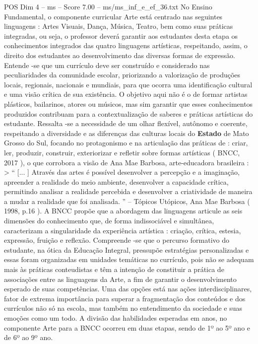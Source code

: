 \begin{textsample}{POS Dim 4 – ms – Score 7.00 – ms/ms\_inf\_e\_ef\_36.txt}
No Ensino Fundamental, o componente curricular Arte está centrado nas seguintes linguagens : Artes Visuais, Dança, Música, Teatro, bem como suas práticas integradas, ou seja, o professor deverá garantir aos estudantes desta etapa os conhecimentos integrados das quatro linguagens artísticas, respeitando, assim, o direito dos estudantes ao desenvolvimento das diversas formas de expressão.
Entende -se que um currículo deve ser construído e considerado nas peculiaridades da comunidade escolar, priorizando a valorização de produções locais, regionais, nacionais e mundiais, para que ocorra uma identificação cultural e uma visão crítica de sua existência.
O objetivo aqui não é o de formar artistas plásticos, bailarinos, atores ou músicos, mas sim garantir que esses conhecimentos produzidos contribuam para a contextualização de saberes e práticas artísticas do estudante.
Ressalta -se a necessidade de um olhar flexível, autônomo e coerente, respeitando a diversidade e as diferenças das culturas locais do \textbf{Estado} de Mato Grosso do Sul, focando no protagonismo e na articulação das práticas de : criar, ler, produzir, construir, exteriorizar e refletir sobre formas artísticas ( BNCC, 2017 ), o que corrobora a visão de Ana Mae Barbosa, arte-educadora brasileira : > “ [... ] Através das artes é possível desenvolver a percepção e a imaginação, apreender a realidade do meio ambiente, desenvolver a capacidade crítica, permitindo analisar a realidade percebida e desenvolver a criatividade de maneira a mudar a realidade que foi analisada. ” – Tópicos Utópicos, Ana Mae Barbosa ( 1998, p.16 ).
A BNCC propõe que a abordagem das linguagens articule as seis dimensões do conhecimento que, de forma indissociável e simultânea, caracterizam a singularidade da experiência artística : criação, crítica, estesia, expressão, fruição e reflexão.
Compreende -se que o percurso formativo do estudante, na ótica da Educação Integral, pressupõe estratégias personalizadas e essas foram organizadas em unidades temáticas no currículo, pois não se adequam mais às práticas conteudistas e têm a intenção de constituir a prática de associações entre as linguagens da Arte, a fim de garantir o desenvolvimento esperado de suas competências.
Uma das opções está nas ações interdisciplinares, fator de extrema importância para superar a fragmentação dos conteúdos e dos currículos não só na escola, mas também no entendimento da sociedade e suas emoções como um todo.
A divisão das habilidades esperadas em anos, no componente Arte para a BNCC ocorreu em duas etapas, sendo de 1º ao 5º ano e de 6º ao 9º ano.

\end{textsample}
